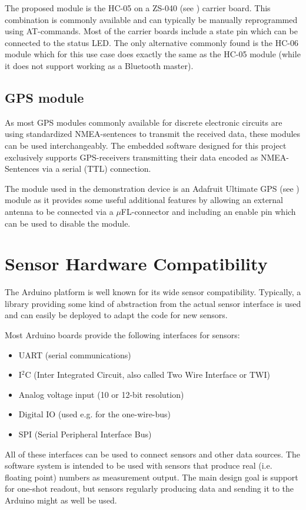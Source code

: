 The proposed module is the HC-05 on a ZS-040 (see \cite{HC-05}) carrier board. This combination is commonly available and can typically be manually reprogrammed using AT-commands. Most of the carrier boards include a state pin which can be connected to the status LED. The only alternative commonly found is the HC-06 module which for this use case does exactly the same as the HC-05 module (while it does not support working as a Bluetooth master).

\subsection{GPS module}
As most GPS modules commonly available for discrete electronic circuits are using standardized NMEA-sentences to transmit the received data, these modules can be used interchangeably. The embedded software designed for this project exclusively supports GPS-receivers transmitting their data encoded as NMEA-Sentences via a serial (TTL) connection.

The module used in the demonstration device is an Adafruit Ultimate GPS (see \cite{AdaUltGPS}) module as it provides some useful additional features by allowing an external antenna to be connected via a $\mu$FL-connector and including an enable pin which can be used to disable the module. 

\section{Sensor Hardware Compatibility}
The Arduino platform is well known for its wide sensor compatibility. Typically, a library providing some kind of abstraction from the actual sensor interface is used and can easily be deployed to adapt the code for new sensors. 

Most Arduino boards provide the following interfaces for sensors:
\begin{itemize}
	\item UART (serial communications)
	\item I$^2$C (Inter Integrated Circuit, also called Two Wire Interface or TWI)
	\item Analog voltage input (10 or 12-bit resolution)
	\item Digital IO (used e.g. for the one-wire-bus)
	\item SPI (Serial Peripheral Interface Bus)
\end{itemize}

All of these interfaces can be used to connect sensors and other data sources. The software system is intended to be used with sensors that produce real (i.e. floating point) numbers as measurement output. The main design goal is support for one-shot readout, but sensors regularly producing data and sending it to the Arduino might as well be used.

